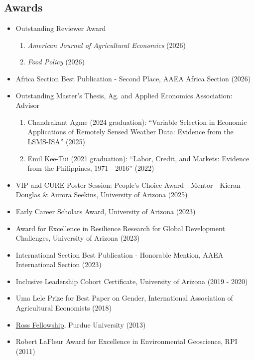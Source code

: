 \documentclass[letterpaper]{article}
\begin{document}
\subsection*{Awards}

\begin{itemize}

   \item Outstanding Reviewer Award
    \begin{enumerate}
         \item \emph{American Journal of Agricultural Economics} (2026)
        \item \emph{Food Policy} (2026)
    \end{enumerate}

\item Africa Section Best Publication - Second Place, AAEA Africa Section (2026)	

	\item Outstanding Master's Thesis, Ag. and Applied Economics Association: Advisor 
    \begin{enumerate}
        \item Chandrakant Agme (2024 graduation): ``Variable Selection in Economic Applications of Remotely Sensed Weather Data: Evidence from the LSMS-ISA'' (2025)
        \item Emil Kee-Tui (2021 graduation): ``Labor, Credit, and Markets: Evidence from the Philippines, 1971 - 2016'' (2022)
    \end{enumerate} 

    \item VIP and CURE Poster Session: People's Choice Award - Mentor - Kieran Douglas \& Aurora Seekins, University of Arizona (2025)
	
	\item Early Career Scholars Award, University of Arizona (2023)
	
	\item Award for Excellence in Resilience Research for Global Development Challenges, University of Arizona (2023) 
	
	\item International Section Best Publication - Honorable Mention, AAEA International Section (2023)	
		
	\item Inclusive Leadership Cohort Certificate, University of Arizona (2019 - 2020) 
	 
	\item Uma Lele Prize for Best Paper on Gender, International Association of Agricultural Economists (2018)
	 
	\item \href{https://www.purdue.edu/gradschool/fellowship/funding-resources-for-students/fellowships/managed-fellowships/recruitment-fellowships.html}{Ross Fellowship}, Purdue University (2013) 
	
	\item Robert LaFleur Award for Excellence in Environmental Geoscience, RPI (2011)
	
\end{itemize}
\end{document}
